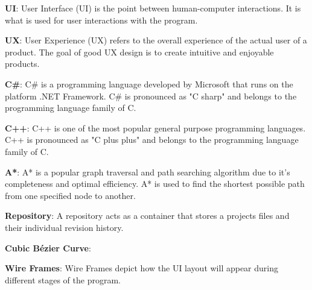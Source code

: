 \noindent
\label{itm:ui}\textbf{UI}: User Interface (UI) is the point between human-computer interactions. It is what is used for user interactions with the program. 

\noindent
\label{itm:ux}\textbf{UX}: User Experience (UX) refers to the overall experience of the actual user of a product. The goal of good UX design is to create intuitive and enjoyable products.

\noindent
\label{itm:csharp}\textbf{C\#}: C\# is a programming language developed by Microsoft that runs on the platform .NET Framework. C\# is pronounced as "C sharp" and belongs to the programming language family of C.

\noindent
\label{itm:c++}\textbf{C++}: C++ is one of the most popular general purpose programming languages. C++ is pronounced as "C plus plus" and belongs to the programming language family of C.

\noindent
\label{itm:a*}\textbf{A*}: A* is a popular graph traversal and path searching algorithm due to it's completeness and optimal efficiency. A* is used to find the shortest possible path from one specified node to another.

\noindent
\label{itm:repository}\textbf{Repository}: A repository acts as a container that stores a projects files and their individual revision history. 

\noindent
\label{itm:cubic-bézier-curve}\textbf{Cubic Bézier Curve}: 

\noindent
\label{itm:wire-frame}\textbf{Wire Frames}: Wire Frames depict how the UI layout will appear during different stages of the program. 





